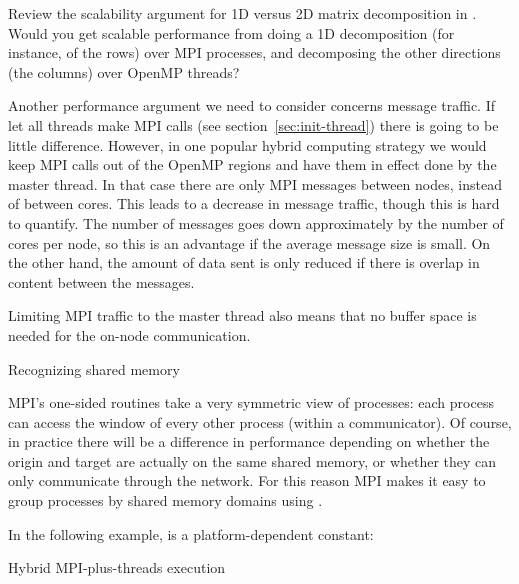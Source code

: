 \begin{exercise}
  Review the scalability argument for 1D versus 2D matrix
  decomposition in . Would you get
  scalable performance from doing a 1D decomposition (for instance, of
  the rows) over MPI processes, and decomposing the other directions
  (the columns) over OpenMP threads?
\end{exercise}

Another performance argument we need to consider concerns message
traffic.  If let all threads make MPI calls (see
section~\ref{sec:init-thread}) there is going to be little
difference. However, in one popular hybrid computing strategy we would
keep MPI calls out of the OpenMP regions and have them in effect done
by the master thread.
%
In that case there are only MPI messages
between nodes, instead of between cores. This leads to a decrease in
message traffic, though this is hard to quantify. The number of
messages goes down approximately by the number of cores per node, so
this is an advantage if the average message size is small. On the
other hand, the amount of data sent is only reduced if there is
overlap in content between the messages.

Limiting MPI traffic to the master thread also means that no buffer
space is needed for the on-node communication.

 {Recognizing shared memory}
\label{mpi-comm-split-type}

MPI's one-sided routines take a very symmetric view of processes:
each process can access the window of every other process (within a communicator).
Of course, in practice there will be a difference in performance
depending on whether the origin and target are actually
on the same shared memory, or whether they can only communicate through the network.
For this reason MPI makes it easy to group processes by shared memory domains
using .


In the following example,  is a platform-dependent
constant:
%

 {Hybrid MPI-plus-threads execution}
\label{sec:init-thread}

